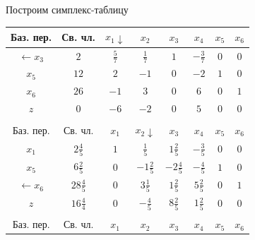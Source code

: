 \documentclass[a4paper,14pt]{extarticle}
\begin{document}
Построим симплекс-таблицу
\begin{center}
    \begin{tabular}{|c|c|c|c|c|c|c|c|}
        \hline
        Баз. пер.        & Св. чл.         & $x_1 \downarrow$ & $x_2$            & $x_3$            & $x_4 $           & $x_5$ & $x_6$          \\
        \hline
        $\leftarrow x_3$ & $2$             & $\frac{5}{7}$    & $\frac{1}{7}$    & $1$              & $-\frac{3}{7}$   & $0$   & $0$            \\
        \hline
        $x_5$            & $12$            & $2$              & $-1$             & $0$              & $-2$             & $1$   & $0$            \\
        \hline
        $x_6$            & $26$            & $-1$             & $3$              & $0$              & $6$              & $0$   & $1$            \\
        \hline
        $z$              & $0$             & $-6$             & $-2$             & $0$              & $5$              & $0$   & $0$            \\
        \hline
        \multicolumn{8}{c}{}                                                                                                                    \\
        \hline
        Баз. пер.        & Св. чл.         & $x_1$            & $x_2 \downarrow$ & $x_3$            & $x_4$            & $x_5$ & $x_6$          \\
        \hline
        $x_1$            & $2\frac{4}{5}$  & $1$              & $\frac{1}{5}$    & $1\frac{2}{5}$   & $-\frac{3}{5}$   & $0$   & $0$            \\
        \hline
        $x_5$            & $6\frac{2}{5}$  & $0$              & $-1\frac{2}{5}$  & $-2\frac{4}{5}$  & $-\frac{4}{5}$   & $1$   & $0$            \\
        \hline
        $\leftarrow x_6$ & $28\frac{4}{5}$ & $0$              & $3\frac{1}{5}$   & $1\frac{2}{5}$   & $5\frac{2}{5}$   & $0$   & $1$            \\
        \hline
        $z$              & $16\frac{4}{4}$ & $0$              & $-\frac{4}{5}$   & $8\frac{2}{5}$   & $1\frac{2}{5}$   & $0$   & $0$            \\
        \hline
        \multicolumn{8}{c}{}                                                                                                                    \\
        \hline
        Баз. пер.        & Св. чл.         & $x_1$            & $x_2$            & $x_3$            & $x_4$            & $x_5$ & $x_6$          \\

\end{tabular}
\end{center}
\end{document}
